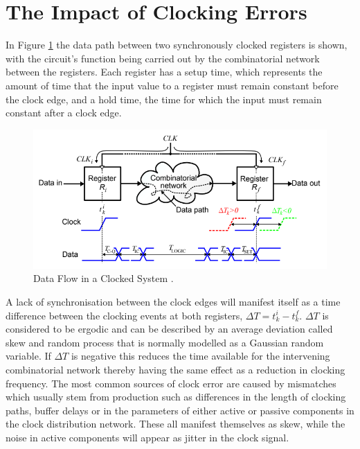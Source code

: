 \documentclass[11pt,english,british]{report}
\begin{document}
\section{The Impact of Clocking Errors}
In Figure \ref{fig:eldar_why_precise_clocking} the data path between two synchronously clocked registers is shown, with the circuit's function being carried out by the combinatorial network between the registers.
Each register has a setup time, which represents the amount of time that the input value to a register must remain constant before the clock edge, and a hold time, the time for which the input must remain constant after a clock edge.
\begin{figure}[h]
	\centering
	\includegraphics[scale=0.5]{../eldar_why_precise_clocking}
	\caption{Data Flow in a Clocked System \cite{zianbetov2013phd}.}
	\label{fig:eldar_why_precise_clocking}
\end{figure}\newline
A lack of synchronisation between the clock edges will manifest itself as a time difference between the clocking events at both registers, $\Delta T = t^i_k - t^f_k$. $\Delta T$ is considered to be ergodic and can be described by an average deviation called skew and random process that is normally modelled as a Gaussian random variable. If $\Delta T$ is negative this reduces the time available for the intervening combinatorial network thereby having the same effect as a reduction in clocking frequency.
The most common sources of clock error are caused by mismatches which usually stem from production such as differences in the length of clocking paths, buffer delays or in the parameters of either active or passive components in the clock distribution network. These all manifest themselves as skew, while the noise in active components will appear as jitter in the clock signal.
\end{document}
